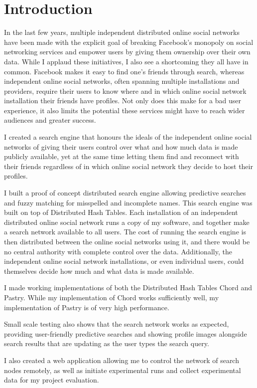 


\chapter{Introduction}
In the last few years, multiple independent distributed online social networks have been made with the explicit goal of breaking Facebook's monopoly on social networking services and empower users by giving them ownership over their own data.
While I applaud these initiatives, I also see a shortcoming they all have in common. Facebook makes it easy to find one's friends through search, whereas independent online social networks, often spanning multiple installations and providers, require their users to know where and in which online social network installation their friends have profiles. Not only does this make for a bad user experience, it also limits the potential these services might have to reach wider audiences and greater success.

I created a search engine that honours the ideals of the independent online social networks of giving their users control over what and how much data is made publicly available, yet at the same time letting them find and reconnect with their friends regardless of in which online social network they decide to host their profiles.

I built a proof of concept distributed search engine allowing predictive searches and fuzzy matching for misspelled and incomplete names. This search engine was built on top of Distributed Hash Tables. Each installation of an independent distributed online social network runs a copy of my software, and together make a search network available to all users. The cost of running the search engine is then distributed between the online social networks using it, and there would be no central authority with complete control over the data. Additionally, the independent online social network installations, or even individual users, could themselves decide how much and what data is made available.

I made working implementations of both the Distributed Hash Tables Chord and Pastry. While my implementation of Chord works sufficiently well, my implementation of Pastry is of very high performance.

Small scale testing also shows that the search network works as expected, providing user-friendly predictive searches and showing profile images alongside search results that are updating as the user types the search query.

I also created a web application allowing me to control the network of search nodes remotely, as well as initiate experimental runs and collect experimental data for my project evaluation.
